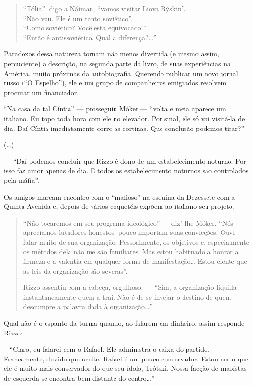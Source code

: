 \begin{quote}
``Tólia'', digo a Náiman, ``vamos visitar Liova Rýskin''. \\
``Não vou. Ele é um  tanto soviético''. \\
``Como soviético? Você está equivocado!'' \\
``Então é antissoviético. Qual a diferença?\ldots{}''
\end{quote}

Paradoxos dessa natureza tornam não menos divertida (e mesmo assim, percuciente) a descrição, na segunda parte do livro, de suas experiências na América, muito próximas da autobiografia. Querendo publicar um novo jornal russo (``O Espelho''), ele e um grupo de companheiros emigrados resolvem procurar um financiador.

``Na casa da tal Cíntia'' --- prosseguiu Móker --- ``volta e meia aparece um italiano. Eu topo toda hora com ele no elevador. Por sinal, ele só vai visitá-la de dia. Daí Cíntia imediatamente corre as cortinas. Que conclusão podemos tirar?''

(\ldots{})

--- ``Daí podemos concluir que Rizzo é dono de um estabelecimento noturno. Por isso faz amor apenas de dia. E todos os estabelecimento noturnos são controlados pela máfia''.

Os amigos marcam encontro com o ``mafioso'' na esquina da Dezessete com a Quinta Avenida e, depois de vários coquetéis expõem ao italiano seu projeto.

\begin{quote}
``Não tocaremos em seu programa ideológico'' --- diz"-lhe Móker. ``Nós apreciamos lutadores honestos, pouco importam suas convicções. Ouvi falar muito de sua organização. Pessoalmente, os objetivos e, especialmente os métodos dela não me são familiares. Mas estou habituado a honrar a firmeza e a valentia em qualquer forma de manifestação\ldots{} Estou ciente que as leis da organização são severas''.

Rizzo assentiu com a cabeça, orgulhoso: --- ``Sim, a organização liquida instantaneamente quem a trai. Não é de se invejar o destino de quem descumpre a palavra dada à organização\ldots{}''
\end{quote}

Qual não é o espanto da turma quando, ao falarem em dinheiro, assim responde Rizzo:

-- ``Claro, eu falarei com o Rafael. Ele administra o caixa do partido. Francamente, duvido que aceite. Rafael é um pouco conservador. Estou certo que ele é muito mais conservador do que seu ídolo, Trótski. Nossa facção de maoístas de esquerda se encontra bem distante do centro\ldots{}''

